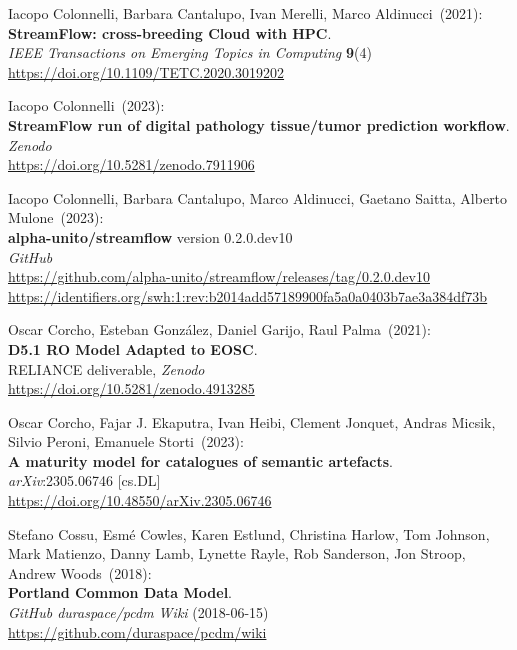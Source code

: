 \begin{thebibliography}{9}
Iacopo Colonnelli, Barbara Cantalupo, Ivan Merelli, Marco Aldinucci~(2021): \\
\textbf{StreamFlow: cross-breeding Cloud with HPC}.\\
\emph{IEEE Transactions on Emerging Topics in Computing} \textbf{9}(4)\\
\url{https://doi.org/10.1109/TETC.2020.3019202}

Iacopo Colonnelli~(2023): \\
\textbf{StreamFlow run of digital pathology tissue/tumor prediction workflow}.\\
\emph{Zenodo}\\
\url{https://doi.org/10.5281/zenodo.7911906}

Iacopo Colonnelli, Barbara Cantalupo, Marco Aldinucci, Gaetano Saitta, Alberto Mulone~(2023): \\
\textbf{alpha-unito/streamflow} version 0.2.0.dev10\\
\emph{GitHub}\\
\url{https://github.com/alpha-unito/streamflow/releases/tag/0.2.0.dev10}\\
\url{https://identifiers.org/swh:1:rev:b2014add57189900fa5a0a0403b7ae3a384df73b}

Oscar Corcho, Esteban González, Daniel Garijo, Raul Palma~(2021): \\
\textbf{D5.1 RO Model Adapted to EOSC}.\\
RELIANCE deliverable, \emph{Zenodo}\\
\url{https://doi.org/10.5281/zenodo.4913285}

Oscar Corcho, Fajar J. Ekaputra, Ivan Heibi, Clement Jonquet, Andras Micsik, Silvio Peroni, Emanuele Storti~(2023): \\
\textbf{A maturity model for catalogues of semantic artefacts}. \\
\emph{arXiv}:2305.06746 [cs.DL] \\
\url{https://doi.org/10.48550/arXiv.2305.06746}

Stefano Cossu, Esmé Cowles, Karen Estlund, Christina Harlow, Tom Johnson, Mark Matienzo, Danny Lamb, Lynette Rayle, Rob Sanderson, Jon Stroop, Andrew Woods~(2018): \\
\textbf{Portland Common Data Model}.\\
\emph{GitHub duraspace/pcdm Wiki} (2018-06-15)\\
\url{https://github.com/duraspace/pcdm/wiki}


\end{thebibliography}

